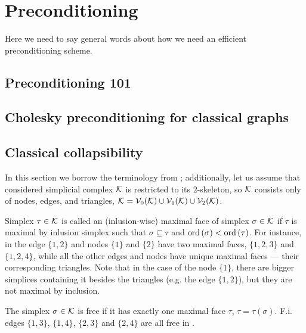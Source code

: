 \section{Preconditioning}

\begin{tmp}
      Here we need to say general words about how we need an efficient preconditioning scheme.
\end{tmp}

\subsection{Preconditioning 101}

\subsection{Cholesky preconditioning for classical graphs}

\subsection{Classical collapsibility}



In this section we borrow the terminology from \cite{whiteheadSimplicialSpacesNuclei1939}; additionally, let us  assume that considered simplicial complex \( \mathcal{K} \) is restricted to its \(2\)-skeleton, so \( \mathcal{K} \) consists only of nodes, edges, and triangles, \( \mathcal{K} = \mathcal{V}_{0}(\mathcal{K}) \cup \mathcal{V}_{1}(\mathcal{K}) \cup \mathcal{V}_{2}(\mathcal{K})\).

Simplex \( \tau \in \mathcal{K} \) is called an (inlusion-wise) \gls{maximal face} of simplex \( \sigma \in \mathcal{K} \) if \( \tau \) is maximal by inlusion simplex such that \( \sigma \subseteq \tau \) and \( \mathrm{ord}\,(\sigma) < \mathrm{ord}\,(\tau) \).  For instance, in  the edge \( \{1, 2\} \) and nodes \( \{ 1 \} \) and \( \{ 2 \} \) have two maximal faces, \( \{ 1, 2, 3 \} \) and \( \{ 1, 2, 4 \} \), while all the other edges and nodes have unique maximal faces --- their corresponding triangles. Note that in the case of the node \( \{ 1 \} \), there are bigger simplices containing it besides the triangles (e.g. the edge \( \{ 1, 2 \} \)), but they are not maximal by inclusion.

\begin{definition}\label{def:free}
      The simplex \(\sigma \in \mathcal{K} \) is \gls{free} if it has exactly one maximal face \( \tau \), \( \tau = \tau(\sigma) \). F.i. edges \( \{ 1, 3 \} \), \( \{ 1, 4 \} \), \( \{ 2, 3 \} \) and \( \{ 2, 4 \} \) are all free in .
\end{definition} 

